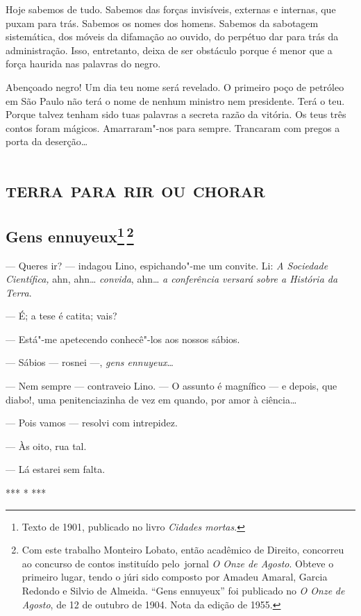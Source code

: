 Hoje sabemos de tudo. Sabemos das forças invisíveis, externas e
internas, que puxam para trás. Sabemos os nomes dos homens. Sabemos da
sabotagem sistemática, dos móveis da difamação ao ouvido, do perpétuo
dar para trás da administração. Isso, entretanto, deixa de ser obstáculo
porque é menor que a força haurida nas palavras do negro.

Abençoado negro! Um dia teu nome será revelado. O primeiro poço de
petróleo em São Paulo não terá o nome de nenhum ministro nem presidente.
Terá o teu. Porque talvez tenham sido tuas palavras a secreta razão da
vitória. Os teus três contos foram mágicos. Amarraram"-nos para sempre.
Trancaram com pregos a porta da deserção\ldots{}

\part{\textsc{terra para rir ou chorar}}

\chapter{Gens ennuyeux\footnote[*]{Texto de 1901, publicado no livro \emph{Cidades mortas}.}\,\footnote[**]{Com este trabalho Monteiro
  Lobato, então acadêmico de Direito, concorreu ao concurso de contos
  instituído pelo~jornal \emph{O Onze de Agosto}. Obteve o primeiro
  lugar, tendo o júri sido composto por Amadeu Amaral, Garcia Redondo e
  Silvio de Almeida. ``Gens ennuyeux'' foi publicado no \emph{O Onze}
  \emph{de Agosto}, de 12 de outubro de 1904. Nota da edição de 1955.}}

--- Queres ir? --- indagou Lino, espichando"-me um convite. Li: \emph{A
Sociedade Científica,} ahn, ahn\ldots{} \emph{convida}, ahn\ldots{} \emph{a
conferência versará sobre a História da Terra}.

--- É; a tese é catita; vais?

--- Está"-me apetecendo conhecê"-los aos nossos sábios.

--- Sábios --- rosnei ---, \emph{gens ennuyeux}\ldots{}

--- Nem sempre --- contraveio Lino. --- O assunto é magnífico --- e
depois, que diabo!, uma penitenciazinha de vez em quando, por amor à
ciência\ldots{}

--- Pois vamos --- resolvi com intrepidez.

--- Às oito, rua tal.

--- Lá estarei sem falta.

*** * ***

